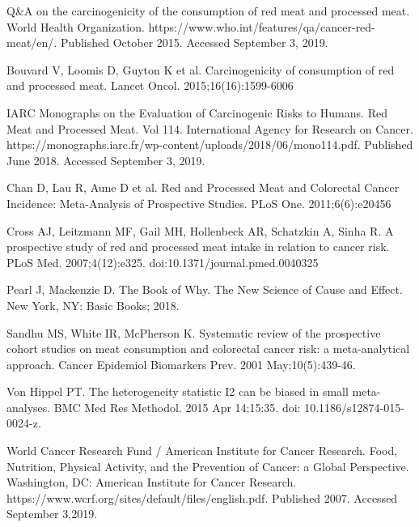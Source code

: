 \documentclass{article}
\begin{document}
\begin{thebibliography}{1}

Q\&A on the carcinogenicity of the consumption of red meat and processed meat. World Health Organization. https://www.who.int/features/qa/cancer-red-meat/en/. Published October 2015. Accessed September 3, 2019.

Bouvard V, Loomis D, Guyton K et al. Carcinogenicity of consumption of red and processed meat. Lancet Oncol. 2015;16(16):1599-6006

IARC Monographs on the Evaluation of Carcinogenic Risks to Humans. Red Meat and Processed Meat. Vol 114. International Agency for Research on Cancer. https://monographs.iarc.fr/wp-content/uploads/2018/06/mono114.pdf. Published June 2018. Accessed September 3, 2019.

Chan D, Lau R, Aune D et al. Red and Processed Meat and Colorectal Cancer Incidence: Meta-Analysis of Prospective Studies. PLoS One. 2011;6(6):e20456

Cross AJ, Leitzmann MF, Gail MH, Hollenbeck AR, Schatzkin A, Sinha R. A prospective study of red and processed meat intake in relation to cancer risk. PLoS Med. 2007;4(12):e325. doi:10.1371/journal.pmed.0040325

Pearl J, Mackenzie D. The Book of Why. The New Science of Cause and Effect. New York, NY: Basic Books; 2018.

Sandhu MS, White IR, McPherson K. Systematic review of the prospective cohort studies on meat consumption and colorectal cancer risk: a meta-analytical approach. Cancer Epidemiol Biomarkers Prev. 2001 May;10(5):439-46.

Von Hippel PT. The heterogeneity statistic I2 can be biased in small meta-analyses. BMC Med Res Methodol. 2015 Apr 14;15:35. doi: 10.1186/s12874-015-0024-z.

World Cancer Research Fund / American Institute for Cancer Research.
Food, Nutrition, Physical Activity, and the Prevention of Cancer: a Global
Perspective. Washington, DC: American Institute for Cancer Research. https://www.wcrf.org/sites/default/files/english.pdf. Published 2007. Accessed September 3,2019.


\end{thebibliography}
\end{document}

